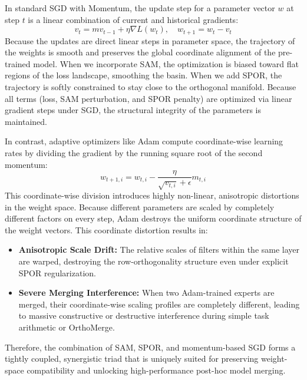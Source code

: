 \documentclass{article}
\theoremstyle{plain}
\theoremstyle{definition}
\theoremstyle{remark}
\begin{document}
In standard SGD with Momentum, the update step for a parameter vector $w$ at step $t$ is a linear combination of current and historical gradients:
\begin{equation}
    v_t = m v_{t-1} + \eta \nabla L(w_t), \quad w_{t+1} = w_t - v_t
\end{equation}
Because the updates are direct linear steps in parameter space, the trajectory of the weights is smooth and preserves the global coordinate alignment of the pre-trained model. When we incorporate SAM, the optimization is biased toward flat regions of the loss landscape, smoothing the basin. When we add SPOR, the trajectory is softly constrained to stay close to the orthogonal manifold. Because all terms (loss, SAM perturbation, and SPOR penalty) are optimized via linear gradient steps under SGD, the structural integrity of the parameters is maintained.

In contrast, adaptive optimizers like Adam compute coordinate-wise learning rates by dividing the gradient by the running square root of the second momentum:
\begin{equation}
    w_{t+1, i} = w_{t, i} - \frac{\eta}{\sqrt{v_{t, i}} + \epsilon} m_{t, i}
\end{equation}
This coordinate-wise division introduces highly non-linear, anisotropic distortions in the weight space. Because different parameters are scaled by completely different factors on every step, Adam destroys the uniform coordinate structure of the weight vectors. This coordinate distortion results in:
\begin{itemize}
    \item \textbf{Anisotropic Scale Drift:} The relative scales of filters within the same layer are warped, destroying the row-orthogonality structure even under explicit SPOR regularization.
    \item \textbf{Severe Merging Interference:} When two Adam-trained experts are merged, their coordinate-wise scaling profiles are completely different, leading to massive constructive or destructive interference during simple task arithmetic or OrthoMerge.
\end{itemize}
Therefore, the combination of SAM, SPOR, and momentum-based SGD forms a tightly coupled, synergistic triad that is uniquely suited for preserving weight-space compatibility and unlocking high-performance post-hoc model merging.
\end{document}

